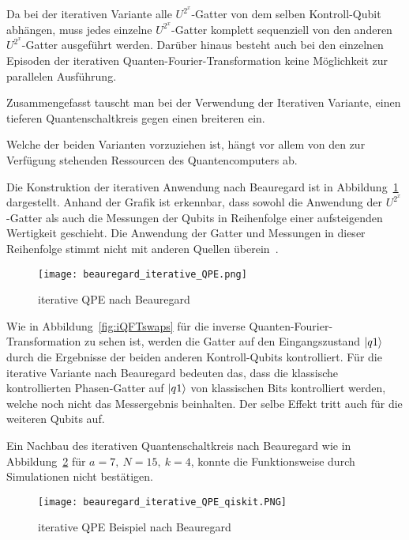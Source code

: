 Da bei der iterativen Variante alle \(U^{2^x}\)-Gatter von dem selben Kontroll-Qubit abhängen, 
muss jedes einzelne \(U^{2^x}\)-Gatter komplett sequenziell von den anderen \(U^{2^x}\)-Gatter ausgeführt werden.
Darüber hinaus besteht auch bei den einzelnen Episoden der iterativen Quanten-Fourier-Transformation keine Möglichkeit zur parallelen Ausführung.

Zusammengefasst tauscht man bei der Verwendung der Iterativen Variante, 
einen tieferen Quantenschaltkreis gegen einen breiteren ein.

Welche der beiden Varianten vorzuziehen ist, 
hängt vor allem von den zur Verfügung stehenden Ressourcen des Quantencomputers ab.

\vspace{1em}

Die Konstruktion der iterativen Anwendung nach Beauregard ist in Abbildung~\ref{fig:iterative_iQPE_Beauregard} dargestellt.
Anhand der Grafik ist erkennbar, 
dass sowohl die Anwendung der \(U^{2^x}\)-Gatter als auch die Messungen der Qubits in Reihenfolge einer aufsteigenden Wertigkeit geschieht.
Die Anwendung der Gatter und Messungen in dieser Reihenfolge stimmt nicht mit anderen Quellen überein~\cite{Parker2000}.

\begin{figure} [H]
  \caption{iterative QPE nach Beauregard~\cite{beauregard2003circuit}}
  \label{fig:iterative_iQPE_Beauregard}
  \texttt{[image: beauregard\_iterative\_QPE.png]}
  \centering
  \end{figure}

Wie in Abbildung~\ref{fig:iQFTswaps} für die inverse Quanten-Fourier-Transformation zu sehen ist, 
werden die Gatter auf den Eingangszustand \(\ket{q1}\) durch die Ergebnisse der beiden anderen Kontroll-Qubits kontrolliert.
Für die iterative Variante nach Beauregard bedeuten das, 
dass die klassische kontrollierten Phasen-Gatter auf \(\ket{q1}\) von klassischen Bits kontrolliert werden, 
welche noch nicht das Messergebnis beinhalten.
Der selbe Effekt tritt auch für die weiteren Qubits auf.

Ein Nachbau des iterativen Quantenschaltkreis nach Beauregard wie in Abbildung~\ref*{fig:iterative_iQPE_Beauregard_qiskit} für \(a = 7,~N=15,~k=4\), 
konnte die Funktionsweise durch Simulationen nicht bestätigen.
\begin{figure} [H]
  \caption{iterative QPE Beispiel nach Beauregard}
  \label{fig:iterative_iQPE_Beauregard_qiskit}
  \texttt{[image: beauregard\_iterative\_QPE\_qiskit.PNG]}
  \centering
  \end{figure}

